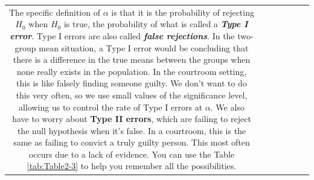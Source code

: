 \documentclass[]{book}
\theoremstyle{definition}
\theoremstyle{definition}
\theoremstyle{remark}
\begin{document}
\begin{longtable}[]{@{}ccccccc@{}}
\begin{minipage}[b]{0.10\columnwidth}
The specific definition of \(\alpha\) is that it is the probability of
rejecting \(H_0\) when \(H_0\) is true, the probability of what is
called a \textbf{\emph{Type I error}}. Type I errors are also called
\textbf{\emph{false rejections}}. In the two-group mean situation, a
Type I error would be concluding that there is a difference in the true
means between the groups when none really exists in the population. In
the courtroom setting, this is like falsely finding someone guilty. We
don't want to do this very often, so we use small values of the
significance level, allowing us to control the rate of Type I errors at
\(\alpha\). We also have to worry about \textbf{Type II errors}, which
are failing to reject the null hypothesis when it's false. In a
courtroom, this is the same as failing to convict a truly guilty person.
This most often occurs due to a lack of evidence. You can use the Table
\ref{tab:Table2-3} to help you remember all the possibilities.





\end{minipage}
\end{longtable}
\end{document}
